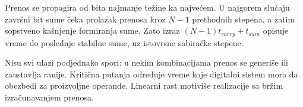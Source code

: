 Prenos se propagira od bita najmanje težine ka najvećem. U najgorem slučaju završni bit sume čeka prolazak prenosa kroz $N-1$ prethodnih stepena, a zatim sopstveno kašnjenje formiranja sume. Zato izraz $(N-1)t_{carry}+t_{sum}$ opisuje vreme do poslednje stabilne sume, uz istovrsne sabiračke stepene.

Nisu svi ulazi podjednako spori: u nekim kombinacijama prenos se generiše ili zaustavlja ranije. Kritična putanja određuje vreme koje digitalni sistem mora da obezbedi za proizvoljne operande. Linearni rast motiviše realizacije sa bržim izračunavanjem prenosa.
